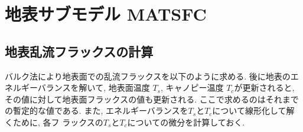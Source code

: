\section{地表サブモデル MATSFC}

\subsection{地表乱流フラックスの計算}

バルク法により地表面での乱流フラックスを以下のように求める.
後に地表のエネルギーバランスを解いて, 地表面温度 $T_s$, キャノピー温度
$T_c$が更新されると, その値に対して地表面フラックスの値も更新される.
ここで求めるのはそれまでの暫定的な値である.
また, エネルギーバランスを$T_s$と$T_c$について線形化して解くために, 各フ
ラックスの$T_s$と$T_c$についての微分を計算しておく.

